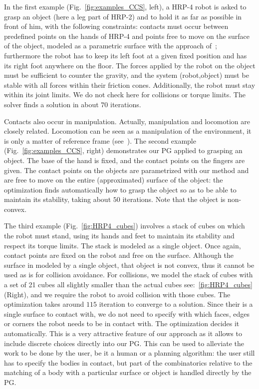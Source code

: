 In the first example (Fig.~\ref{fig:examples_CCS}, left), a HRP-4 robot is asked to grasp an object (here a leg part of HRP-2) and to hold it as far as possible in front of him, with the following constraints: contacts must occur between predefined points on the hands of HRP-4 and points free to move on the surface of the object, modeled as a parametric surface with the approach of~\cite{escande:icra:2016}; furthermore the robot has to keep its left foot at a given fixed position and has its right foot anywhere on the floor.
The forces applied by the robot on the object must be sufficient to counter the gravity, and the system (robot,object) must be stable with all forces within their friction cones.
Additionally, the robot must stay within its joint limits.
We do not check here for collisions or torque limits.
The solver finds a solution in about $70$ iterations.

Contacts also occur in manipulation.
Actually, manipulation and locomotion are closely related.
Locomotion can be seen as a manipulation of the environment, it is only a matter of reference frame (see~\cite{bouyarmane:ar:2012}).
The second example (Fig.~\ref{fig:examples_CCS}, right) demonstrates our PG applied to grasping an object.
The base of the hand is fixed, and the contact points on the fingers are given.
The contact points on the objects are parametrized with our method and are free to move on the entire (approximated) surface of the object: the optimization finds automatically how to grasp the object so as to be able to maintain its stability, taking about $50$ iterations.
Note that the object is non-convex.

The third example (Fig.~\ref{fig:HRP4_cubes}) involves a stack of cubes on which the robot must stand, using its hands and feet to maintain its stability and respect its torque limits.
The stack is modeled as a single object.
Once again, contact points are fixed on the robot and free on the surface.
Although the surface in modeled by a single object, that object is not convex, thus it cannot be used as is for collision avoidance.
For collisions, we model the stack of cubes with a set of 21 cubes all slightly smaller than the actual cubes see:~\ref{fig:HRP4_cubes} (Right), and we require the robot to avoid collision with those cubes.
The optimization takes around $115$ iteration to converge to a solution.
Since their is a single surface to contact with, we do not need to specify with which faces, edges or corners the robot needs to be in contact with.
The optimization decides it automatically.
This is a very attractive feature of our approach as it allows to include discrete choices directly into our PG\@.
This can be used to alleviate the work to be done by the user, be it a human or a planning algorithm: the user still has to specify the bodies in contact, but part of the combinatorics relative to the matching of a body with a particular surface or object is handled directly by the PG\@.

